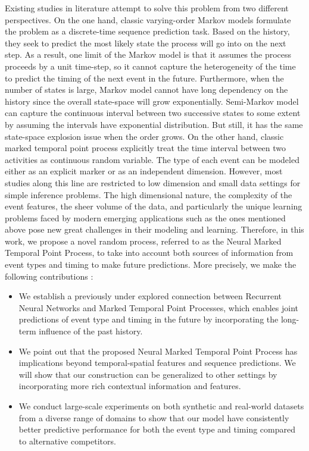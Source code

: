 \documentclass{sig-alternate-05-2015}
\begin{document}
Existing studies in literature attempt to solve this problem from two different perspectives. On the one hand, classic varying-order Markov models formulate the problem as a discrete-time sequence prediction task. Based on the history, they seek to predict the most likely state the process will go into on the next step. As a result, one limit of the Markov model is that it assumes the process proceeds by a unit time-step, so it cannot capture the heterogeneity of the time to predict the timing of the next event in the future. Furthermore, when the number of states is large, Markov model cannot have long dependency on the history since the overall state-space will grow exponentially. Semi-Markov model can capture the continuous interval between two successive states to some extent by assuming the intervals have exponential distribution. But still, it has the same state-space explosion issue when the order grows. On the other hand, classic marked temporal point process explicitly treat the time interval between two activities as continuous random variable. The type of each event can be modeled either as an explicit marker or as an independent dimension. However, most studies along this line are restricted to low dimension and small data settings for simple inference problems. The high dimensional nature, the complexity of the event features, the sheer volume of the data, and particularly the unique learning problems faced by modern emerging applications such as the ones mentioned above pose new great challenges in their modeling and learning. Therefore, in this work, we propose a novel random process, referred to as the Neural Marked Temporal Point Process, to take into account both sources of information from event types and timing to make future predictions. More precisely, we make the following contributions :
\begin{itemize}
\item We establish a previously under explored connection between Recurrent Neural Networks and Marked Temporal Point Processes, which enables joint predictions of event type and timing in the future by incorporating the long-term influence of the past history.

\item We point out that the proposed Neural Marked Temporal Point Process has implications beyond temporal-spatial features and sequence predictions. We will show that our construction can be generalized to other settings by incorporating more rich contextual information and features.

\item We conduct large-scale experiments on both synthetic and real-world datasets from a diverse range of domains to show that our model have consistently better predictive performance for both the event type and timing  compared to alternative competitors. 

\end{itemize}
 
\end{document}
